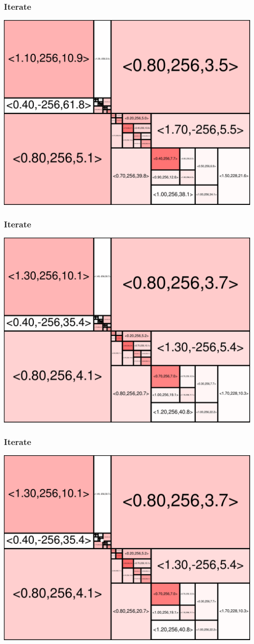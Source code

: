 \begin{frame}
\frametitle{Iterate}\begin{centering}\includegraphics[width=8.5 cm]{remy-graph/graph/test51.pdf}

\end{centering}\end{frame}


\begin{frame}
\frametitle{Iterate}\begin{centering}\includegraphics[width=8.5 cm]{remy-graph/graph/test52.pdf}

\end{centering}\end{frame}


\begin{frame}
\frametitle{Iterate}\begin{centering}\includegraphics[width=8.5 cm]{remy-graph/graph/test53.pdf}

\end{centering}\end{frame}


